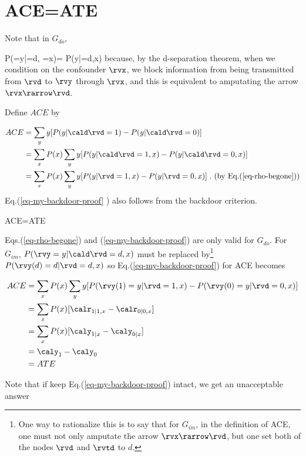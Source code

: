 \section{ACE=ATE}

Note that in $G_{do}$,

\beq
P(\rvy=y|\cald \rvd=d, \rvx=x)=
P(y|\rvd=d,x)
\;
\label{eq-rho-begone}
\eeq
because, by the d-separation
theorem,  when we condition on
the confounder $\rvx$,
we  block information from being
transmitted from $\rvd$ to $\rvy$ through $\rvx$,
and this is equivalent to
amputating the arrow $\rvx\rarrow\rvd$.

Define $ACE$ by

\begin{align}
ACE&=\sum_y y
[P(y|\cald\rvd=1)-P(y|\cald\rvd=0)]
\\
&=
\sum_x P(x)\sum_y y [P(y|\cald\rvd=1,x)-P(y|\cald\rvd=0,x)]
\\
&=
\sum_x P(x)\sum_y y [P(y|\rvd=1,x)-P(y|\rvd=0,x)]
\;. \text{ (by Eq.(\ref{eq-rho-begone}))}
\label{eq-my-backdoor-proof}
\end{align}
Eq.(\ref{eq-my-backdoor-proof} )
also follows from the backdoor criterion.


\begin{claim}\label{cl-ace-ate}
\beq
ACE=ATE
\eeq
\end{claim}
\proof

Eqs.(\ref{eq-rho-begone})
and (\ref{eq-my-backdoor-proof})
are only valid for $G_{do}$.
For $G_{im}$,
$P(\rvy=y|\cald \rvd=d, x)$
must be replaced by\footnote{
One way to rationalize this is to say
that for $G_{im}$,
in the definition of ACE,
one must not only amputate
the arrow $\rvx\rarrow \rvd$,
but
one
set both of the nodes $\rvd$ and $\rvtd$ to $d$.}
$P(\rvy(d)=d|\rvd=d,x)$
so Eq.(\ref{eq-my-backdoor-proof})
for ACE becomes


\begin{align}
ACE&=
\sum_x P(x)\sum_y y [P(\rvy(1)=y|\rvd=1,x)-
P(\rvy(0)=y|\rvd=0,x)]
\\
&=\sum_x P(x)[\calr_{1|1, x}-\calr_{0|0, x}]
\\
&=
\sum_x P(x)[\caly_{1|x}-\caly_{0|x}]
\\
&=
\caly_{1}-\caly_{0}
\\
&=
ATE
\end{align}

Note that if keep
Eq.(\ref{eq-my-backdoor-proof}) intact,
we get an unacceptable answer

